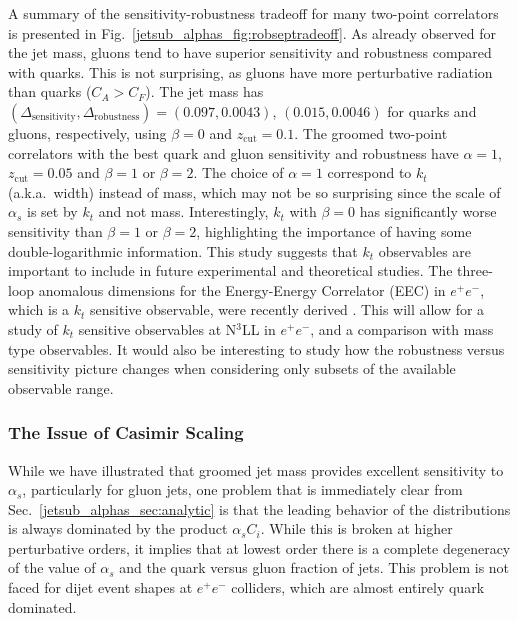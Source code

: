 \documentclass[11pt]{cernrep}
\begin{document}
A summary of the sensitivity-robustness tradeoff for many two-point correlators is presented in Fig.~\ref{jetsub_alphas_fig:robseptradeoff}.  As already observed for the jet mass, gluons tend to have superior sensitivity and robustness compared with quarks.
%
This is not surprising, as gluons have more perturbative radiation than quarks ($C_A>C_F$).
%
The jet mass has $(\Delta_\mathrm{sensitivity},\Delta_\mathrm{robustness})=(0.097,0.0043)$, $(0.015,0.0046)$ for quarks and gluons, respectively, using $\beta=0$ and $z_\mathrm{cut}=0.1$.
%
The groomed two-point correlators with the best quark and gluon sensitivity and robustness have $\alpha=1$, $z_\mathrm{cut}=0.05$ and $\beta=1$ or $\beta=2$.
%
The choice of $\alpha=1$ correspond to $k_t$ (a.k.a.~width) instead of mass, which may not be so surprising since the scale of $\alpha_s$ is set by $k_t$ and not mass.
%
Interestingly, $k_t$ with $\beta=0$ has significantly worse sensitivity than $\beta=1$ or $\beta=2$, highlighting the importance of having some double-logarithmic information. 
%
This study suggests that $k_t$ observables are important to include in future experimental and theoretical studies. The three-loop anomalous dimensions for the Energy-Energy Correlator (EEC) in $e^+e^-$, which is a $k_t$ sensitive observable, were recently derived \cite{Moult:2018jzp}. This will allow for a study of $k_t$ sensitive observables at N$^3$LL in $e^+e^-$, and a comparison with mass type observables. 
%
It would also be interesting to study how the robustness versus sensitivity picture changes when considering only subsets of the available observable range.

\subsubsection{The Issue of Casimir Scaling}
\label{jetsub_alphas_sec:casimir}

While we have illustrated that groomed jet mass provides excellent sensitivity to $\alpha_s$, particularly for gluon jets, one problem that is immediately clear from Sec.~\ref{jetsub_alphas_sec:analytic} is that the leading behavior of the distributions is always dominated by the product $\alpha_s C_i$.
%
While this is broken at higher perturbative orders, it implies that at lowest order there is a complete degeneracy of the value of $\alpha_s$ and the quark versus gluon fraction of jets.
%
This problem is not faced for dijet event shapes at $e^+e^-$ colliders, which are almost entirely quark dominated.
\end{document}
